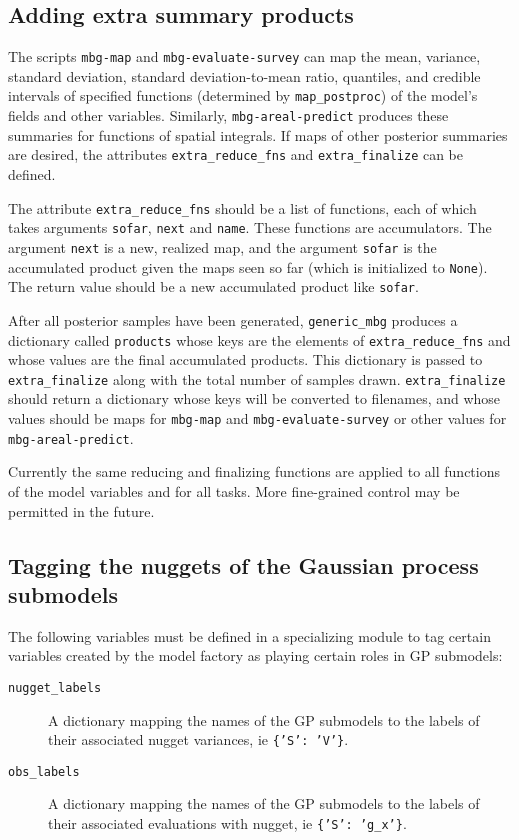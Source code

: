 \subsection{Adding extra summary products}
The scripts \texttt{mbg-map} and \texttt{mbg-evaluate-survey} can map the mean, variance, standard deviation, standard deviation-to-mean ratio, quantiles, and credible intervals of specified functions (determined by \texttt{map\_postproc}) of the model's fields and other variables. Similarly, \texttt{mbg-areal-predict} produces these summaries for functions of spatial integrals. If maps of other posterior summaries are desired, the attributes \texttt{extra\_reduce\_fns} and \texttt{extra\_finalize} can be defined.

The attribute \texttt{extra\_reduce\_fns} should be a list of functions, each of which takes arguments \texttt{sofar}, \texttt{next} and \texttt{name}. These functions are accumulators. The argument \texttt{next} is a new, realized map, and the argument \texttt{sofar} is the accumulated product given the maps seen so far (which is initialized to \texttt{None}). The return value should be a new accumulated product like \texttt{sofar}.

After all posterior samples have been generated, \texttt{generic\_mbg} produces a dictionary called \texttt{products} whose keys are the elements of \texttt{extra\_reduce\_fns} and whose values are the final accumulated products. This dictionary is passed to \texttt{extra\_finalize} along with the total number of samples drawn. \texttt{extra\_finalize} should return a dictionary whose keys will be converted to filenames, and whose values should be maps for \texttt{mbg-map} and \texttt{mbg-evaluate-survey} or other values for \texttt{mbg-areal-predict}.

Currently the same reducing and finalizing functions are applied to all functions of the model variables and for all tasks. More fine-grained control may be permitted in the future.

\subsection{Tagging the nuggets of the Gaussian process submodels}
\label{sub:variable-tags} 
The following variables must be defined in a specializing module to tag certain variables created by the model factory as playing certain roles in GP submodels:
\begin{description}
    \item[\texttt{nugget\_labels}] A dictionary mapping the names of the GP submodels to the labels of their associated nugget variances, ie \texttt{\{'S': 'V'\}}.
    \item[\texttt{obs\_labels}] A dictionary mapping the names of the GP submodels to the labels of their associated evaluations with nugget, ie \texttt{\{'S': 'g\_x'\}}.
\end{description}


